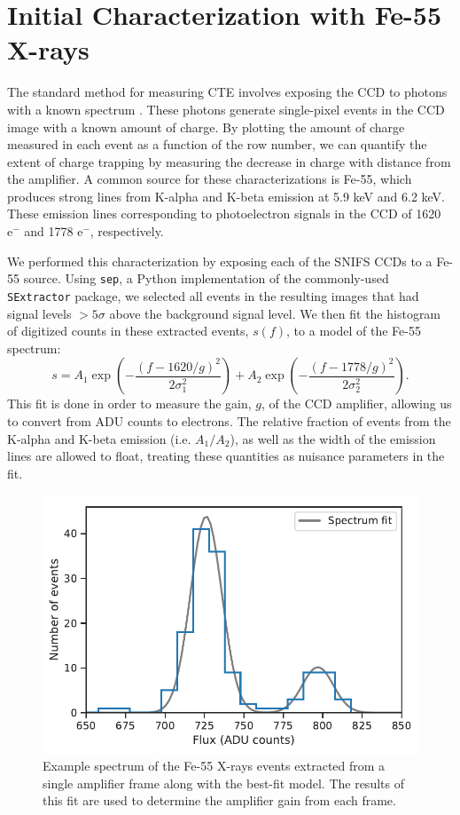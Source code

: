\section{Initial Characterization with Fe-55 X-rays}
The standard method for measuring CTE involves exposing the CCD to photons with a known spectrum \cite{janesick_scientific_2001}. These photons generate single-pixel events in the CCD image with a known amount of charge. By plotting the amount of charge measured in each event as a function of the row number, we can quantify the extent of charge trapping by measuring the decrease in charge with distance from the amplifier. A common source for these characterizations is Fe-55, which produces strong lines from K-alpha and K-beta emission at 5.9 keV and 6.2 keV. These emission lines corresponding to photoelectron signals in the CCD of 1620 $\textrm{e}^-$ and 1778 $\textrm{e}^-$, respectively.

 We performed this characterization by exposing each of the SNIFS CCDs to a Fe-55 source. Using \verb|sep|, a Python implementation of the commonly-used \verb|SExtractor| package, we selected all events in the resulting images that had signal levels $>5\sigma$ above the background signal level. We then fit the histogram of digitized counts in these extracted events, $s(f)$, to a model of the Fe-55 spectrum:
\begin{equation}
    s = A_1 \exp\left(-\frac{(f-1620/g)^2}{2\sigma_1^2}\right) + A_2 \exp\left(-\frac{(f-1778/g)^2}{2\sigma_2^2}\right).
\end{equation}
This fit is done in order to measure the gain, $g$, of the CCD amplifier, allowing us to convert from ADU counts to electrons. The relative fraction of events from the K-alpha and K-beta emission (i.e. $A_1/A_2$), as well as the width of the emission lines are allowed to float, treating these quantities as nuisance parameters in the fit.

\begin{figure}
    \centering
    \includegraphics{figures/cte/spectrum_fit.pdf}
    \caption{Example spectrum of the Fe-55 X-rays events extracted from a single amplifier frame along with the best-fit model. The results of this fit are used to determine the amplifier gain from each frame.}
    \label{fig:xray_spectrum}
\end{figure}

